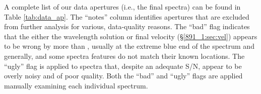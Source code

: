 




A complete list of our data apertures (i.e., the final spectra) can be
found in Table \ref{tab:data_ap}. The ``notes'' column identifies
apertures that are excluded from further analysis for various,
data-quality reasons. The ``bad'' flag indicates that the either the
wavelength solution or final velocity (\S\ref{891_1:sec:vel}) appears
to be wrong by more than , usually at the extreme
blue end of the spectrum and generally, and some spectra features do
not match their known locations. The ``ugly'' flag is applied to
spectra that, despite an adequate S/N, appear to be overly noisy and
of poor quality. Both the ``bad'' and ``ugly'' flags are applied
manually examining each individual spectrum.

